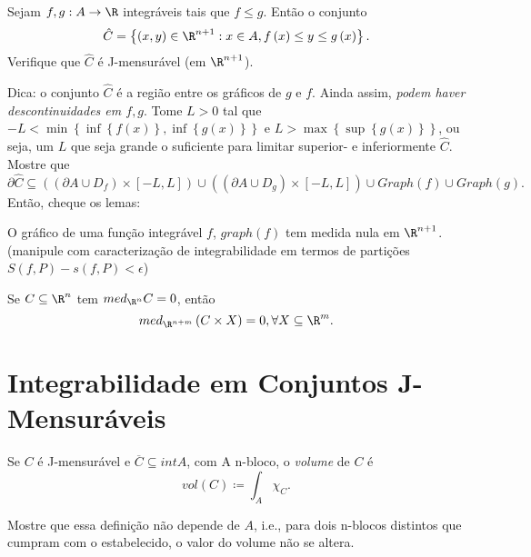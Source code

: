 \begin{problem}
    Sejam $f,g: A\to \R$ integráveis tais que $f\le g$. Então o conjunto \[
    \hat{C} = \left\{ \left( x,y \right) \in \R^{n+1}: x\in A, f\left( x \right) \le y \le g\left( x \right)  \right\} 
.\] Verifique que $\hat{C}$ é J-mensurável (em $\R^{n+1}$).

Dica: o conjunto $\hat{C}$ é a região entre os gráficos de $g$ e $f$. Ainda assim, \emph{podem haver descontinuidades em $f, g$}. Tome $L >0$ tal que $-L < \min \left\{ \inf \left\{ f\left( x \right)  \right\} , \inf\left\{ g(x) \right\}  \right\} $ e $L > \max\left\{ \sup \left\{ g\left( x \right)  \right\}  \right\} $, ou seja, um $L$ que seja grande o suficiente para limitar superior- e inferiormente $\hat{C}$. Mostre que \[
\partial \hat{C} \subseteq \left( \left( \partial A \cup  D_f\right)  \times \left[ -L,L \right]  \right) \cup \left( \left(  \partial A \cup D_g\right)  \times \left[ -L,L \right]  \right) \cup Graph\left( f \right) \cup Graph\left( g \right) 
.\] Então, cheque os lemas:
\begin{lemma}
    O gráfico de uma função integrável $f$, $graph \left( f \right) $ tem medida nula em $\R^{n+1}$.
    (manipule com caracterização de integrabilidade em termos de partições $S\left( f, P \right) - s\left( f, P\right) <\epsilon$)
\end{lemma}
\begin{lemma}
    Se $C\subseteq \R^{n}$ tem $med_{\R^{n}} C=0$, então \[
    med_{\R^{n+m}}\left( C\times X \right) = 0, \forall X\subseteq\R^{m}
    .\] 
\end{lemma}
\end{problem}

\section*{Integrabilidade em Conjuntos J-Mensuráveis}

\begin{definition}
    Se $C$ é J-mensurável e $\overline{C} \subseteq int A$, com A n-bloco, o \emph{volume} de $C$ é \[
    vol\left( C \right) \coloneqq \int_A \chi_C
    .\]
\end{definition}

\begin{problem}
    Mostre que essa definição não depende de $A$, i.e., para dois n-blocos distintos que cumpram com o estabelecido, o valor do volume não se altera.
\end{problem}

